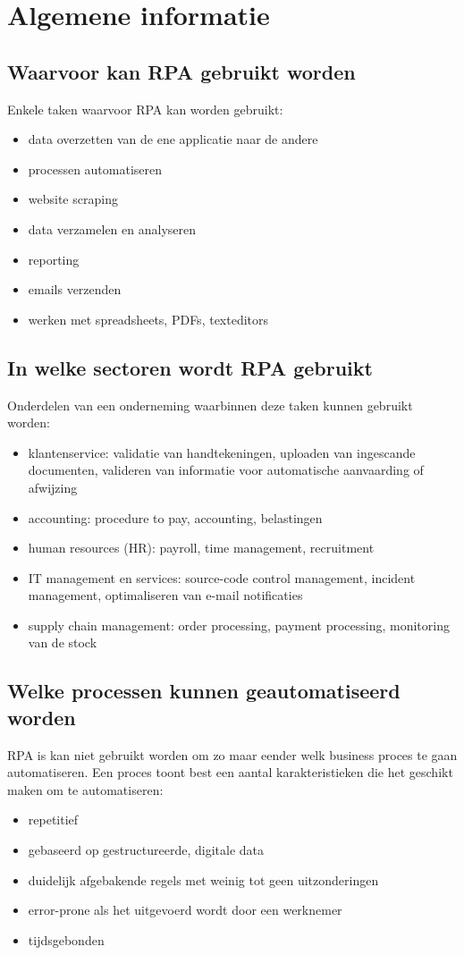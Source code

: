 \section{Algemene informatie}

\subsection{Waarvoor kan RPA gebruikt worden}
Enkele taken waarvoor RPA kan worden gebruikt:
\begin{itemize}
	\item data overzetten van de ene applicatie naar de andere
	\item processen automatiseren
	\item website scraping
	\item data verzamelen en analyseren
	\item reporting
	\item emails verzenden
	\item werken met spreadsheets, PDFs, texteditors
\end{itemize}
\autocite{everythingRPA} \autocite{idrRPA}

\subsection{In welke sectoren wordt RPA gebruikt}
Onderdelen van een onderneming waarbinnen deze taken kunnen gebruikt worden:
\begin{itemize}
	\item klantenservice: validatie van handtekeningen, uploaden van ingescande documenten, valideren van informatie voor automatische aanvaarding of afwijzing
	\item accounting: procedure to pay, accounting, belastingen
	\item human resources (HR): payroll, time management, recruitment
	\item IT management en services: source-code control management, incident management, optimaliseren van e-mail notificaties
	\item supply chain management: order processing, payment processing, monitoring van de stock
\end{itemize}
\autocite{everythingRPA}

\subsection{Welke processen kunnen geautomatiseerd worden}
RPA is kan niet gebruikt worden om zo maar eender welk business proces te gaan automatiseren. Een proces toont best een aantal karakteristieken die het geschikt maken om te automatiseren:
\begin{itemize}
	\item repetitief
	\item gebaseerd op gestructureerde, digitale data
	\item duidelijk afgebakende regels met weinig tot geen uitzonderingen
	\item error-prone als het uitgevoerd wordt door een werknemer
	\item tijdsgebonden
\end{itemize}

